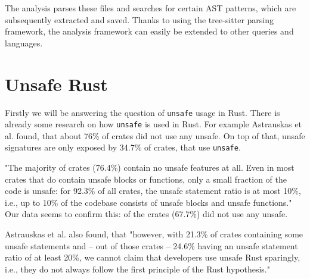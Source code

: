 \documentclass{book}
\newcommand{\code}[1]{\texttt{#1}}
\theoremstyle{definition}
\begin{document}

The analysis parses these files and searches for certain AST patterns, which are subsequently extracted and saved.
Thanks to using the tree-sitter parsing framework, the analysis framework can easily be extended to other queries and languages.

\label{ss:unsafe-rust}\section{Unsafe Rust}

Firstly we will be answering the question of \code{unsafe} usage in Rust.
There is already some research on how \code{unsafe} is used in Rust. For example Astrauskas et al. \cite{astrauskas_how_2020} found, that about 76\% of crates did not use any unsafe. On top of that, unsafe signatures are only exposed by 34.7\% of crates, that use \code{unsafe}.

"The majority of crates (76.4\%) contain no unsafe features at all. Even in most crates that do contain unsafe blocks or functions, only a small fraction of the code is unsafe: for 92.3\% of all crates, the unsafe statement ratio is at most 10\%, i.e., up to 10\% of the codebase consists of unsafe blocks and unsafe functions." \cite[p. 13]{astrauskas_how_2020}
Our data seems to confirm this:  of the  crates (67.7\%) did not use any unsafe. 

Astrauskas et al. also found, that "however, with 21.3\% of crates containing some unsafe statements and – out of those crates – 24.6\% having an unsafe statement ratio of at least 20\%, we cannot claim that developers use unsafe Rust sparingly, i.e., they do not always follow the first principle of the Rust hypothesis." \cite[p. 14]{astrauskas_how_2020}
\end{document}
